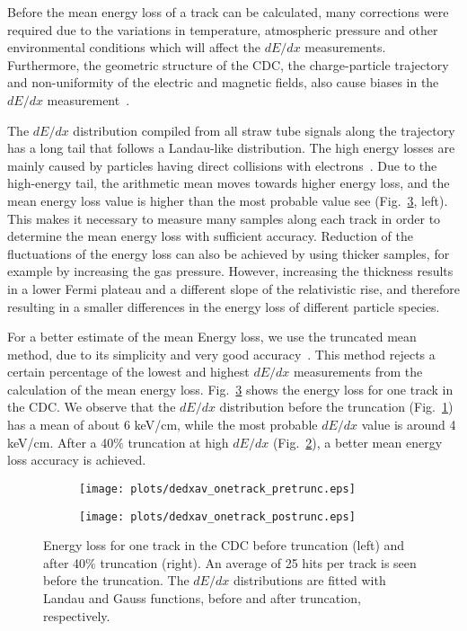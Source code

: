 Before the mean energy loss of a track can be calculated, many corrections were required due to the variations in temperature, atmospheric pressure and other environmental conditions which will affect the $dE/dx$ measurements. Furthermore, the geometric structure of the CDC, the charge-particle trajectory and non-uniformity of the electric and magnetic fields, also cause biases in the $dE/dx$ measurement~\cite{Blum08,Cao10,Hauschild96}.
~\par The $dE/dx$ distribution compiled from all straw tube signals along the trajectory has a long tail that follows a Landau-like distribution. The high energy losses are mainly caused by particles having direct collisions with electrons~\cite{Leo94}. Due to the high-energy tail, the arithmetic mean moves towards higher energy loss, and the mean energy loss value is higher than the most probable value see (Fig.~\ref{fig.3.3}, left). This makes it necessary to measure many samples along each track in order to determine the mean energy loss with sufficient accuracy. Reduction of the fluctuations of the energy loss can also be achieved by using thicker samples, for example by increasing the gas pressure. However, increasing the thickness results in a lower Fermi plateau and a different slope of the relativistic rise, and therefore resulting in a smaller differences in the energy loss of different particle species.
~\par For a better estimate of the mean Energy loss, we use the truncated mean method, due to its simplicity and very good accuracy~\cite{Blum08,Cao10,Hauschild96}. This method rejects a certain percentage of the lowest and highest $dE/dx$ measurements from the calculation of the mean energy loss. Fig.~\ref{fig.3.3} shows the energy loss for one track in the CDC. We observe that the $dE/dx$ distribution before the truncation (Fig.~\ref{fig.3.3.a}) has a mean of about 6 keV/cm, while the most probable $dE/dx$ value is around 4 keV/cm. After a 40$\%$ truncation at high $dE/dx$ (Fig.~\ref{fig.3.3.b}), a better mean energy loss accuracy is achieved.

\begin{figure}[H]
    \centering
    \begin{subfigure}[b]{0.5\textwidth}
        \texttt{[image: plots/dedxav\_onetrack\_pretrunc.eps]}
        \caption{}
        \label{fig.3.3.a}        
    \end{subfigure}\hfill
    \begin{subfigure}[b]{0.5\textwidth}
        \texttt{[image: plots/dedxav\_onetrack\_postrunc.eps]}
        \caption{}
        \label{fig.3.3.b}        
    \end{subfigure}
    \caption{Energy loss for one track in the CDC before truncation (left) and after 40$\%$ truncation (right). An average of 25 hits per track is seen before the truncation. The $dE/dx$ distributions are fitted with Landau and Gauss functions, before and after truncation, respectively.}
    \label{fig.3.3}
\end{figure}
\vfill

